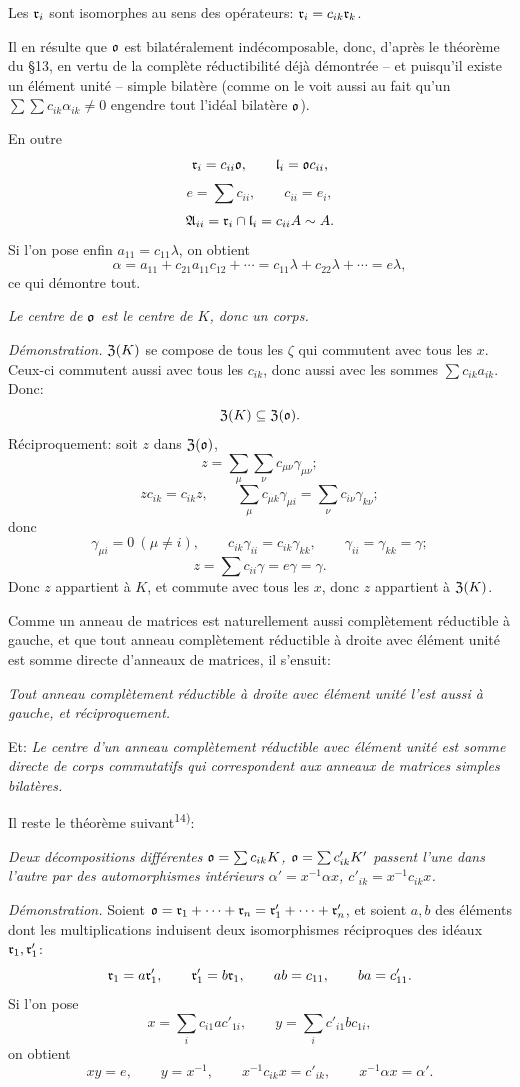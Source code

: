 Les $\mathfrak{r}_i$ sont isomorphes au sens des opérateurs: $\mathfrak{r}_i=c_{ik}\mathfrak{r}_k$.

Il en résulte que $\mathfrak{o}$ est bilatéralement indécomposable, donc, d'après le théorème du \S{}13, en vertu de la complète réductibilité déjà démontrée -- et puisqu'il existe un élément unité -- simple bilatère (comme on le voit aussi au fait qu'un $\sum\sum c_{ik}\alpha_{ik}\ne0$ engendre tout l'idéal bilatère $\mathfrak{o}$).

En outre
\[
        \mathfrak{r}_i=c_{ii}\mathfrak{o},
        \qquad
        \mathfrak{l}_i=\mathfrak{o} c_{ii},
\]
\[
        e=\sum c_{ii},
        \qquad c_{ii}=e_i,
\]
\[
        \mathfrak{A}_{ii}=\mathfrak{r}_i\cap\mathfrak{l}_i=c_{ii}A\sim A.
\]
Si l'on pose enfin $a_{11}=c_{11}\lambda$, on obtient
\[
        \alpha=a_{11}+c_{21}a_{11}c_{12}+\cdots
        =c_{11}\lambda+c_{22}\lambda+\cdots=e\lambda,
\]
ce qui démontre tout.

\emph{Le centre de $\mathfrak{o}$ est le centre de $K$, donc un corps.}

\emph{Démonstration.} $\mathfrak{Z}(K)$ se compose de tous les $\zeta$ qui commutent avec tous les $x$. Ceux-ci commutent aussi avec tous les $c_{ik}$, donc aussi avec les sommes $\sum c_{ik}a_{ik}$. Donc:
\[
        \mathfrak{Z}(K)\subseteq\mathfrak{Z}(\mathfrak{o}).
\]
Réciproquement: soit $z$ dans $\mathfrak{Z}(\mathfrak{o})$,
\[
        z=\sum_\mu\sum_\nu c_{\mu\nu}\gamma_{\mu\nu};
\]
\[
        zc_{ik}=c_{ik}z,
        \qquad
        \sum_\mu c_{\mu k}\gamma_{\mu i}=\sum_\nu c_{i\nu}\gamma_{k\nu};
\]
donc
\[
        \gamma_{\mu i}=0\ (\mu\ne i),
        \qquad
        c_{ik}\gamma_{ii}=c_{ik}\gamma_{kk},
        \qquad
        \gamma_{ii}=\gamma_{kk}=\gamma;
\]
\[
        z=\sum c_{ii}\gamma=e\gamma=\gamma.
\]
Donc $z$ appartient à $K$, et commute avec tous les $x$, donc $z$ appartient à $\mathfrak{Z}(K)$.

Comme un anneau de matrices est naturellement aussi complètement réductible à gauche, et que tout anneau complètement réductible à droite avec élément unité est somme directe d'anneaux de matrices, il s'ensuit:

\emph{Tout anneau complètement réductible à droite avec élément unité l'est aussi à gauche, et réciproquement.}

Et: \emph{Le centre d'un anneau complètement réductible avec élément unité est somme directe de corps commutatifs qui correspondent aux anneaux de matrices simples bilatères.}

Il reste le théorème suivant\textsuperscript{14)}:

\emph{Deux décompositions différentes $\mathfrak{o}=\sum c_{ik}K$, $\mathfrak{o}=\sum c'_{ik}K'$ passent l'une dans l'autre par des automorphismes intérieurs $\alpha'=x^{-1}\alpha x$, $c'_{ik}=x^{-1}c_{ik}x$.}

\emph{Démonstration.} Soient $\mathfrak{o}=\mathfrak{r}_1+\cdots+\mathfrak{r}_n=\mathfrak{r}_1'+\cdots+\mathfrak{r}_n'$, et soient $a,b$ des éléments dont les multiplications induisent deux isomorphismes réciproques des idéaux $\mathfrak{r}_1,\mathfrak{r}_1'$:
\[
        \mathfrak{r}_1=a\mathfrak{r}_1',
        \qquad
        \mathfrak{r}_1'=b\mathfrak{r}_1,
        \qquad
        ab=c_{11},
        \qquad
        ba=c'_{11}.
\]
Si l'on pose
\[
        x=\sum_i c_{i1}ac'_{1i},
        \qquad
        y=\sum_i c'_{i1}bc_{1i},
\]
on obtient
\[
        xy=e,
        \qquad
        y=x^{-1},
        \qquad
        x^{-1}c_{ik}x=c'_{ik},
        \qquad
        x^{-1}\alpha x=\alpha'.
\]
